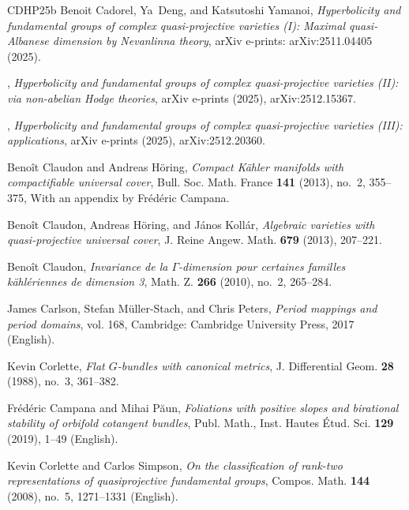 \documentclass[english]{amsproc}
\theoremstyle{plain}
\theoremstyle{definition}
\theoremstyle{remark}
\theoremstyle{plain}
\numberwithin{equation}{thm} %
\begin{document}
\begin{thebibliography}{CDHP25b}
		Benoit {Cadorel}, Ya~{Deng}, and Katsutoshi {Yamanoi}, \emph{{Hyperbolicity and
				fundamental groups of complex quasi-projective varieties (I): Maximal
				quasi-Albanese dimension by Nevanlinna theory}}, arXiv e-prints:
		arXiv:2511.04405 (2025).
		
		\bysame, \emph{{Hyperbolicity and fundamental groups of complex
				quasi-projective varieties (II): via non-abelian Hodge theories}}, arXiv
		e-prints (2025), arXiv:2512.15367.
		
		\bysame, \emph{{Hyperbolicity and fundamental groups of complex
				quasi-projective varieties (III): applications}}, arXiv e-prints (2025),
		arXiv:2512.20360.
		
		Beno\^it Claudon and Andreas H\"oring, \emph{Compact {K}\"ahler manifolds with
			compactifiable universal cover}, Bull. Soc. Math. France \textbf{141} (2013),
		no.~2, 355--375, With an appendix by Fr\'ed\'eric Campana. 
		
		Beno\^it Claudon, Andreas H\"oring, and J\'anos Koll\'ar, \emph{Algebraic
			varieties with quasi-projective universal cover}, J. Reine Angew. Math.
		\textbf{679} (2013), 207--221. 
		
		Beno\^it Claudon, \emph{Invariance de la {$\Gamma$}-dimension pour certaines
			familles k\"ahl\'eriennes de dimension 3}, Math. Z. \textbf{266} (2010),
		no.~2, 265--284. 
		
		James {Carlson}, Stefan {M\"uller-Stach}, and Chris {Peters}, \emph{{Period
				mappings and period domains}}, vol. 168, Cambridge: Cambridge University
		Press, 2017 (English).
		
		Kevin Corlette, \emph{Flat {$G$}-bundles with canonical metrics}, J.
		Differential Geom. \textbf{28} (1988), no.~3, 361--382. 
		
		Fr{\'e}d{\'e}ric Campana and Mihai P{\u{a}}un, \emph{Foliations with positive
			slopes and birational stability of orbifold cotangent bundles}, Publ. Math.,
		Inst. Hautes {\'E}tud. Sci. \textbf{129} (2019), 1--49 (English).
		
		Kevin Corlette and Carlos Simpson, \emph{On the classification of rank-two
			representations of quasiprojective fundamental groups}, Compos. Math.
		\textbf{144} (2008), no.~5, 1271--1331 (English).
		

\end{thebibliography}
\end{document}
